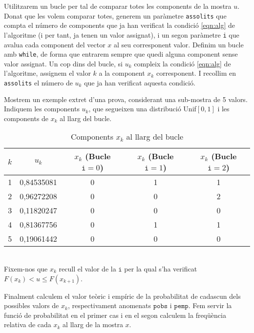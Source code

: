 \documentclass[11pt,a4paper]{article}
\begin{document}
Utilitzarem un bucle per tal de comparar totes les components de la mostra $u$.
Donat que les volem comparar totes, generem un paràmetre \texttt{assolits} que compta el número de components que ja han verificat la condició \ref{eqn:alg} de l'algoritme (i per tant, ja tenen un valor assignat), i un segon paràmetre \texttt{i} que avalua cada component del vector $x$ al seu corresponent valor. Definim un bucle amb \texttt{while}, de forma que entrarem sempre que quedi alguna component sense valor assignat. Un cop dins del bucle, si $u_k$ compleix la condició \ref{eqn:alg} de l'algoritme, assignem el valor $k$ a la component $x_k$ corresponent. I recollim en \texttt{assolits} el número de $u_k$ que ja han verificat aquesta condició.

Mostrem un exemple extret d'una prova, considerant una sub-mostra de 5 valors. Indiquem les components $u_k$, que segueixen una distribució Unif$[0,1]$ i les components de $x_k$ al llarg del bucle.
\begin{table}[ht]
  \centering
  \begin{tabular}{|c||c||c|c|c|}
    \hline
    $k$ & $u_k$      & $x_k$ (Bucle $\texttt{i}=0$) & $x_k$ (Bucle $\texttt{i}=1$) & $x_k$ (Bucle $\texttt{i}=2$) \\
    \hline
    1   & 0,84535081 & 0                            & 1                            & 1                            \\
    \hline
    2   & 0,96272208 & 0                            & 0                            & 2                            \\
    \hline
    3   & 0,11820247 & 0                            & 0                            & 0                            \\
    \hline
    4   & 0,81367756 & 0                            & 1                            & 1                            \\
    \hline
    5   & 0,19061442 & 0                            & 0                            & 0                            \\
    \hline
  \end{tabular}
  \caption{Components $x_k$ al llarg del bucle}
  \label{pr2-1}
\end{table}\\
Fixem-nos que $x_k$ recull el valor de la $\texttt{i}$ per la qual s'ha verificat $F(x_k)<u\leq F(x_{k+1})$.

Finalment calculem el valor teòric i empíric de la probabilitat de cadascun dels possibles valors de $x_k$, respectivament anomenats $\texttt{pobs}$ i $\texttt{pemp}$. Fem servir la funció de probabilitat en el primer cas i en el segon calculem la freqüència relativa de cada $x_k$ al llarg de la mostra $x$.
\end{document}
